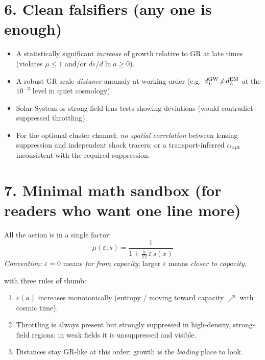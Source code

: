 \documentclass[aps,prd,onecolumn,superscriptaddress,nofootinbib]{revtex4-2}
\newcommand{\eps}{\varepsilon}
\begin{document}
\section*{6. Clean falsifiers (any one is enough)}
\begin{itemize}
\item A statistically significant \emph{increase} of growth relative to GR at late times (violates $\mu\le 1$ and/or $d\eps/d\ln a\ge 0$).
\item A robust GR-scale \emph{distance} anomaly at working order (e.g.\ $d_L^{\rm GW}\!\neq\!d_L^{\rm EM}$ at the $10^{-3}$ level in quiet cosmology).
\item Solar-System or strong-field lens tests showing deviations (would contradict suppressed throttling).
\item For the optional cluster channel: \emph{no spatial correlation} between lensing suppression and independent shock tracers; or a transport-inferred $\alpha_{\rm opt}$ inconsistent with the required suppression.
\end{itemize}

\section*{7. Minimal math sandbox (for readers who want one line more)}
All the action is in a single factor:
\[
\boxed{\quad \mu(\eps,s)=\frac{1}{1+\frac{5}{12}\,\eps\,s(x)} \quad}
\]
\noindent\emph{Convention:} $\varepsilon=0$ means \emph{far from capacity}; larger $\varepsilon$ means \emph{closer to capacity}.

with three rules of thumb:
\begin{enumerate}
\item $\eps(a)$ increases monotonically (entropy / moving toward capacity $\nearrow$ with cosmic time).
\item Throttling is always present but strongly suppressed in high-density, strong-field regions; in weak fields it is unsuppressed and visible.
\item Distances stay GR-like at this order; growth is the \emph{leading} place to look.
\end{enumerate}

 
\end{document}

